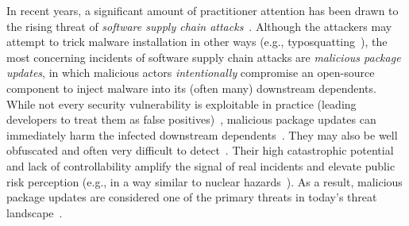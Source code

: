 In recent years, a significant amount of practitioner attention has been drawn to the rising threat of \emph{software supply chain attacks}~\cite{DBLP:conf/dimva/OhmPS020, DBLP:conf/sp/LadisaPMB23}. 
Although the attackers may attempt to trick malware installation in other ways (e.g., typosquatting~\cite{DBLP:conf/eurosp/VuPMPS20}), the most concerning incidents of software supply chain attacks are \emph{malicious package updates}, in which malicious actors \textit{intentionally} compromise an open-source component to inject malware into its (often many) downstream dependents.
While not every security vulnerability is exploitable in practice (leading developers to treat them as false positives)~\cite{DBLP:conf/codaspy/YounisMAR16, DBLP:journals/corr/abs-1908-04856, mirhosseini2017can}, malicious package updates can immediately harm the infected downstream dependents~\cite{martinez2021software}. 
They may also be well obfuscated and often very difficult to detect~\cite{xz-utils}.
Their high catastrophic potential and lack of controllability amplify the signal of real incidents and elevate public risk perception (e.g., in a way similar to nuclear hazards~\cite{slovic1987perception}).
As a result, malicious package updates are considered one of the primary threats in today's threat landscape~\cite{enisa-report, whitehouse-order}.
 
